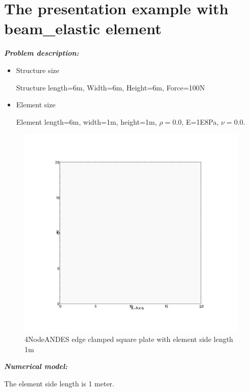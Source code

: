 \documentclass[fleqn,11pt,letter]{article}
\begin{document}
\newpage
\section{The presentation example with beam\_elastic element}



\emph{\textbf{Problem description:}}

\begin{itemize}
  \item Structure size

    Structure length=6m, Width=6m, Height=6m, Force=100N 

  \item Element size

    Element length=6m, width=1m, height=1m, $\rho=0.0$, E=1E8Pa, $\nu=0.0$.
\end{itemize}





\begin{figure}[H]
  \centering
  \includegraphics[width=11cm]{../Figure_files/4NodeANDES/square_plate_descrp.pdf}
  \caption{4NodeANDES edge clamped square plate with element side length 1m }
  \label{fig 4NodeANDES edges clamped square plate with element side length 1m }
\end{figure}


\newpage
\noindent \emph{\textbf{Numerical model:}}

The element side length is 1 meter. 
\end{document}
